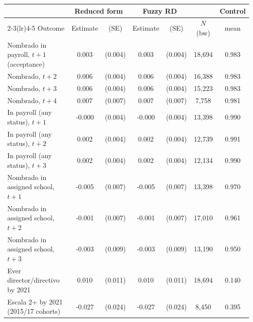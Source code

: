 \begin{tabular}{lcccccc}
\toprule
 & \multicolumn{2}{c}{Reduced form} & \multicolumn{2}{c}{Fuzzy RD} & & Control \\
\cmidrule(lr){2-3}\cmidrule(lr){4-5}
Outcome & Estimate & (SE) & Estimate & (SE) & $N$ (bw) & mean \\
\midrule
Nombrado in payroll, $t+1$ (acceptance) & 0.003 & (0.004) & 0.003 & (0.004) & 18,694 & 0.983 \\
Nombrado, $t+2$ & 0.006 & (0.004) & 0.006 & (0.004) & 16,388 & 0.983 \\
Nombrado, $t+3$ & 0.006 & (0.004) & 0.006 & (0.004) & 15,223 & 0.983 \\
Nombrado, $t+4$ & 0.007 & (0.007) & 0.007 & (0.007) & 7,758 & 0.981 \\
In payroll (any status), $t+1$ & -0.000 & (0.004) & -0.000 & (0.004) & 13,398 & 0.990 \\
In payroll (any status), $t+2$ & 0.002 & (0.004) & 0.002 & (0.004) & 12,739 & 0.991 \\
In payroll (any status), $t+3$ & 0.002 & (0.004) & 0.002 & (0.004) & 12,134 & 0.990 \\
Nombrado in assigned school, $t+1$ & -0.005 & (0.007) & -0.005 & (0.007) & 13,398 & 0.970 \\
Nombrado in assigned school, $t+2$ & -0.001 & (0.007) & -0.001 & (0.007) & 17,010 & 0.961 \\
Nombrado in assigned school, $t+3$ & -0.003 & (0.009) & -0.003 & (0.009) & 13,190 & 0.950 \\
Ever director/directivo by 2021 & 0.010 & (0.011) & 0.010 & (0.011) & 18,694 & 0.140 \\
Escala 2+ by 2021 (2015/17 cohorts) & -0.027 & (0.024) & -0.027 & (0.024) & 8,450 & 0.395 \\
\bottomrule
\end{tabular}
